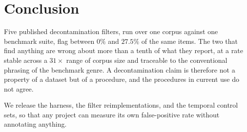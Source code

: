\documentclass[11pt]{article}
\begin{document}
\section{Conclusion}

Five published decontamination filters, run over one corpus against one benchmark
suite, flag between $0\%$ and $27.5\%$ of the same items. The two that find
anything are wrong about more than a tenth of what they report, at a rate stable
across a $31\times$ range of corpus size and traceable to the conventional
phrasing of the benchmark genre. A decontamination claim is therefore not a
property of a dataset but of a procedure, and the procedures in current use do not
agree.

We release the harness, the filter reimplementations, and the temporal control
sets, so that any project can measure its own false-positive rate without
annotating anything.


\end{document}
